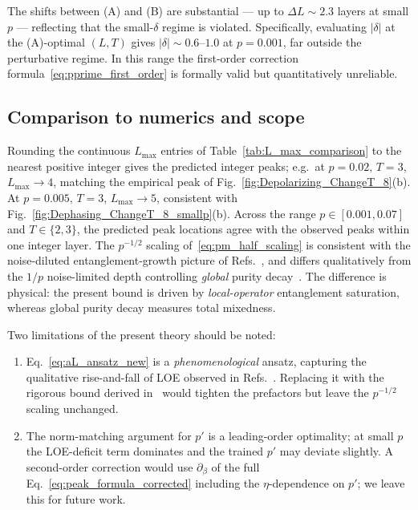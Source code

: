 \documentclass[%
 reprint,
superscriptaddress,
 amsmath,amssymb,
 aps,
]{revtex4-2}
\begin{document}
The shifts between (A) and (B) are substantial — up to $\Delta L \sim 2.3$ layers at small $p$ — reflecting that the small-$\delta$ regime is violated. Specifically, evaluating $|\delta|$ at the (A)-optimal $(L,T)$ gives $|\delta|\sim 0.6$--$1.0$ at $p=0.001$, far outside the perturbative regime. In this range the first-order correction formula~\eqref{eq:pprime_first_order} is formally valid but quantitatively unreliable.

\subsection{Comparison to numerics and scope}

Rounding the continuous $L_{\max}$ entries of Table~\ref{tab:L_max_comparison} to the nearest positive integer gives the predicted integer peaks; e.g.\ at $p=0.02,\,T=3$, $L_{\max}\to 4$, matching the empirical peak of Fig.~\ref{fig:Depolarizing_ChangeT_8}(b). At $p=0.005,\,T=3$, $L_{\max}\to 5$, consistent with Fig.~\ref{fig:Dephasing_ChangeT_8_smallp}(b). Across the range $p\in[0.001,0.07]$ and $T\in\{2,3\}$, the predicted peak locations agree with the observed peaks within one integer layer. The $p^{-1/2}$ scaling of~\eqref{eq:pm_half_scaling} is consistent with the noise-diluted entanglement-growth picture of Refs.~\cite{noh2020efficient,LOE_EE_Decreasing1}, and differs qualitatively from the $1/p$ noise-limited depth controlling \emph{global} purity decay~\cite{aharonov2023polynomial,deshpande2022tight}. The difference is physical: the present bound is driven by \emph{local-operator} entanglement saturation, whereas global purity decay measures total mixedness.

Two limitations of the present theory should be noted:
\begin{enumerate}
    \item Eq.~\eqref{eq:aL_ansatz_new} is a \emph{phenomenological} ansatz, capturing the qualitative rise-and-fall of LOE observed in Refs.~\cite{LOE_EE_Decreasing1,noh2020efficient}. Replacing it with the rigorous bound derived in~\cite{noh2020efficient} would tighten the prefactors but leave the $p^{-1/2}$ scaling unchanged.
    \item The norm-matching argument for $p'$ is a leading-order optimality; at small $p$ the LOE-deficit term dominates and the trained $p'$ may deviate slightly. A second-order correction would use $\partial_\beta$ of the full Eq.~\eqref{eq:peak_formula_corrected} including the $\eta$-dependence on $p'$; we leave this for future work.
\end{enumerate}
\end{document}
